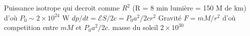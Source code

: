 \begin{solution}
\begin{questions}
    \question Puissance isotrope qui decroit comme $R^2$ (R = 8 min lumière = 150 M de km) d'où $P_0 \sim 2\times 10^{24}$ W
    \question $dp/dt = \mathcal{E}S/2c = P_0 a^2 / 2cr^2$
    \question Gravité $F = mM/r^2$ d'où competition entre $mM$ et $P_0a^2/2c$. masse du soleil $2 \times 10^{30}$
\end{questions}
\end{solution}